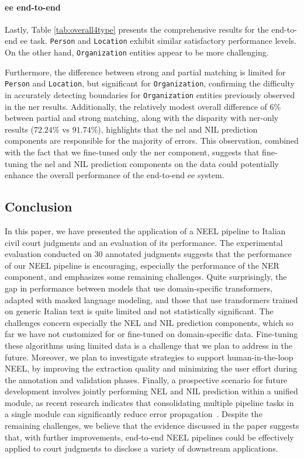 


\paragraph{\ac{ee} end-to-end}

Lastly, Table \ref{tab:overall4type} presents the comprehensive results for the end-to-end \ac{ee} task. \texttt{Person} and \texttt{Location} exhibit similar satisfactory performance levels. On the other hand, \texttt{Organization} entities appear to be more challenging.

Furthermore, the difference between strong and partial matching is limited for \texttt{Person} and \texttt{Location}, but significant for \texttt{Organization}, confirming the difficulty in accurately detecting boundaries for \texttt{Organization} entities previously observed in the \ac{ner} results. Additionally, the relatively modest overall difference of $6\%$ between partial and strong matching, along with the disparity with \ac{ner}-only results ($72.24\%$ vs $91.74\%$), highlights that the \ac{nel} and NIL prediction components are responsible for the majority of errors. This observation, combined with the fact that we fine-tuned only the \ac{ner} component, suggests that fine-tuning the \ac{nel} and NIL prediction components on the data could potentially enhance the overall performance of the end-to-end \ac{ee} system.



\subsection{Conclusion}
In this paper, we have presented the application of a NEEL pipeline to Italian civil court judgments and an evaluation of its performance.  
The experimental evaluation conducted on 30 annotated judgments suggests that the performance of our NEEL pipeline is encouraging, especially the performance of the NER component, and emphasizes some remaining challenges. Quite surprisingly, the gap in performance between models that use domain-specific transformers, adapted with masked language modeling, and those that use transformers trained on generic Italian text is quite limited and not statistically significant. The challenges concern especially the NEL and NIL prediction components, which so far we have not customized for or fine-tuned on domain-specific data. Fine-tuning these algorithms using limited data is a challenge that we plan to address in the future. Moreover, we plan to investigate strategies to support human-in-the-loop NEEL, by improving the extraction quality and minimizing the user effort during the annotation and validation phases.
Finally, a prospective scenario for future development involves jointly performing NEL and NIL prediction within a unified module, as recent research indicates that consolidating multiple pipeline tasks in a single module can significantly reduce error propagation~\cite{kolitsas-etal-2018-end}.
Despite the remaining challenges, we believe that the evidence discussed in the paper suggests that, with further improvements, end-to-end NEEL pipelines could be effectively applied to court judgments to disclose a variety of downstream applications.
